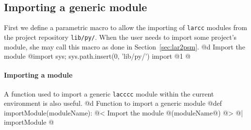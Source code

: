 \documentclass[11pt,oneside]{article}    %
\begin{document}
\appendix
\subsection{Importing a generic module}
First we define a parametric macro to allow the importing of \texttt{larcc} modules from the project repository \texttt{lib/py/}. When the user needs to import some project's module, she may call this macro as done in Section~\ref{sec:lar2psm}.
@d Import the module
@{import sys; sys.path.insert(0, 'lib/py/')
import @1
@}

\paragraph{Importing a module} A function used to import a generic \texttt{lacccc} module within the current environment is also useful.
@d Function to import a generic module
@{def importModule(moduleName):
    @< Import the module @(moduleName@) @>
@| importModule @}





\end{document}
